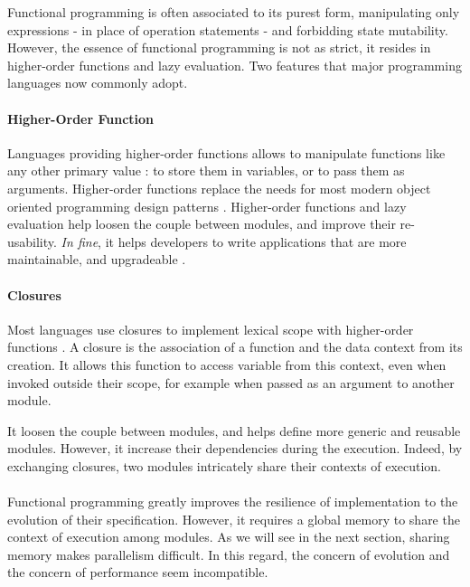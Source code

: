 Functional programming is often associated to its purest form, manipulating only expressions - in place of operation statements - and forbidding state mutability.
However, the essence of functional programming is not as strict, it resides in higher-order functions and lazy evaluation.
Two features that major programming languages now commonly adopt.

\paragraph{Higher-Order Function}

Languages providing higher-order functions allows to manipulate functions like any other primary value : to store them in variables, or to pass them as arguments.
Higher-order functions replace the needs for most modern object oriented programming design patterns .
Higher-order functions and lazy evaluation help loosen the couple between modules, and improve their re-usability.
\textit{In fine}, it helps developers to write applications that are more maintainable, and upgradeable \cite{Hughes1989}.

\paragraph{Closures}

Most languages use closures to implement lexical scope with higher-order functions \cite{Sussman1998}.
A closure is the association of a function and the data context from its creation.
It allows this function to access variable from this context, even when invoked outside their scope, for example when passed as an argument to another module.

It loosen the couple between modules, and helps define more generic and reusable modules.
However, it increase their dependencies during the execution.
Indeed, by exchanging closures, two modules intricately share their contexts of execution.

\paragraph{}

Functional programming greatly improves the resilience of implementation to the evolution of their specification.
However, it requires a global memory to share the context of execution among modules.
As we will see in the next section, sharing memory makes parallelism difficult.
In this regard, the concern of evolution and the concern of performance seem incompatible.


\endinput

\subsubsection{Modularity based on Design Decisions}

Designing Software for ease of extension and contraction \cite{Parnas1979}

Design Rules: The Power of Modularity Volume 1 \cite{Baldwin1999}
A reference book, but I can't get it.
